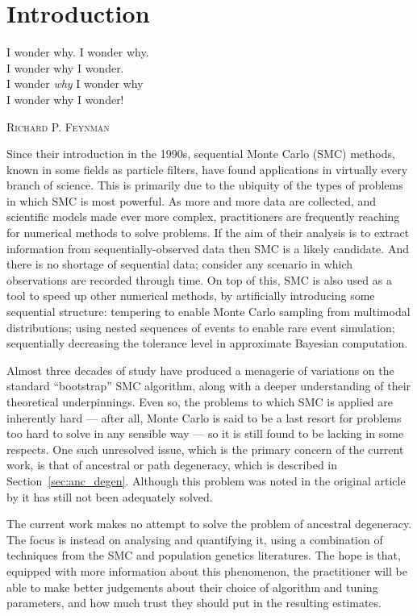 \chapter{Introduction}

\epigraph{
I wonder why. I wonder why.\\
I wonder why I wonder.\\
I wonder \emph{why} I wonder why\\
I wonder why I wonder!
}
{\textsc{Richard P. Feynman}}

Since their introduction in the 1990s, sequential Monte Carlo (SMC) methods, known in some fields as particle filters, have found applications in virtually every branch of science. 
This is primarily due to the ubiquity of the types of problems in which SMC is most powerful.
As more and more data are collected, and scientific models made ever more complex, practitioners are frequently reaching for numerical methods to solve problems.
If the aim of their analysis is to extract information from sequentially-observed data then SMC is a likely candidate. And there is no shortage of sequential data; consider any scenario in which observations are recorded through time. 
On top of this, SMC is also used as a tool to speed up other numerical methods, by artificially introducing some sequential structure: tempering to enable Monte Carlo sampling from multimodal distributions; using nested sequences of events to enable rare event simulation; sequentially decreasing the tolerance level in approximate Bayesian computation.

Almost three decades of study have produced a menagerie of variations on the standard ``bootstrap'' SMC algorithm, along with a deeper understanding of their theoretical underpinnings.
Even so, the problems to which SMC is applied are inherently hard --- after all, Monte Carlo is said to be a last resort for problems too hard to solve in any sensible way --- so it is still found to be lacking in some respects.
One such unresolved issue, which is the primary concern of the current work, is that of ancestral or path degeneracy, which is described in Section~\ref{sec:anc_degen}. Although this problem was noted in the original article by \textcite{gordon1993} it has still not been adequately solved.

The current work makes no attempt to solve the problem of ancestral degeneracy. The focus is instead on analysing and quantifying it, using a combination of techniques from the SMC and population genetics literatures. 
The hope is that, equipped with more information about this phenomenon, the practitioner will be able to make better judgements about their choice of algorithm and tuning parameters, and how much trust they should put in the resulting estimates.
\\[10pt]

